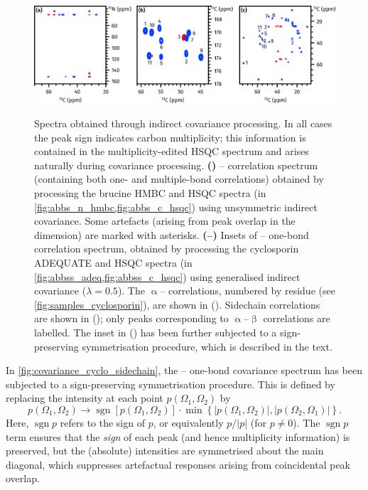 \documentclass[a4paper,12pt]{article}
\DeclareMathOperator*{\sgn}{sgn}
\newcommand{\proton}{\ch{^{1}H}}
\newcommand{\carbon}{\ch{^{13}C}}
\newcommand{\nitrogen}{\ch{^{15}N}}
\begin{document}
\begin{refsection}
\begin{figure}[ht]
    \centering
    \includegraphics[]{covariance.png}%
    {\label{fig:covariance_brucine_nc}}
    {\label{fig:covariance_cyclo_caco}}
    {\label{fig:covariance_cyclo_sidechain}}
    \caption{
        Spectra obtained through indirect covariance processing.
        In all cases the peak sign indicates carbon multiplicity; this information is contained in the multiplicity-edited \carbon{} HSQC spectrum and arises naturally during covariance processing.
        \textbf{()} \carbon{}--\nitrogen{} correlation spectrum (containing both one- and multiple-bond correlations) obtained by processing the brucine \nitrogen{} HMBC and \carbon{} HSQC spectra (in \cref{fig:abbs_n_hmbc,fig:abbs_c_hsqc}) using unsymmetric indirect covariance.
        Some artefacts (arising from peak overlap in the \proton{} dimension) are marked with asterisks.
        \textbf{(--)} Insets of \carbon{}--\carbon{} one-bond correlation spectrum, obtained by processing the cyclosporin ADEQUATE and \carbon{} HSQC spectra (in \cref{fig:abbss_adeq,fig:abbss_c_hsqc}) using generalised indirect covariance ($\lambda = 0.5$).
        The $\upalpha$-- correlations, numbered by residue (see \cref{fig:samples_cyclosporin}), are shown in ().
        Sidechain  correlations are shown in (); only peaks corresponding to $\upalpha$--$\upbeta$ correlations are labelled.
        The inset in () has been further subjected to a sign-preserving symmetrisation procedure, which is described in the text.
    }
    \label{fig:covariance}
\end{figure}

In \cref{fig:covariance_cyclo_sidechain}, the \carbon{}--\carbon{} one-bond covariance spectrum has been subjected to a sign-preserving symmetrisation procedure.
This is defined by replacing the intensity at each point $p(\Omega_1, \Omega_2)$ by
\begin{equation}
    \label{eq:covariance_symmetrisation}
    p(\Omega_1, \Omega_2) \to \sgn[p(\Omega_1, \Omega_2)] \cdot \min\left\{|p(\Omega_1, \Omega_2)|, |p(\Omega_2, \Omega_1)|\right\}.
\end{equation}
Here, $\sgn{p}$ refers to the sign of $p$, or equivalently $p / |p|$ (for $p \neq 0$).
The $\sgn{p}$ term ensures that the \textit{sign} of each peak (and hence multiplicity information) is preserved, but the (absolute) intensities are symmetrised about the main diagonal, which suppresses artefactual responses arising from coincidental peak overlap.


\end{refsection}
\end{document}
